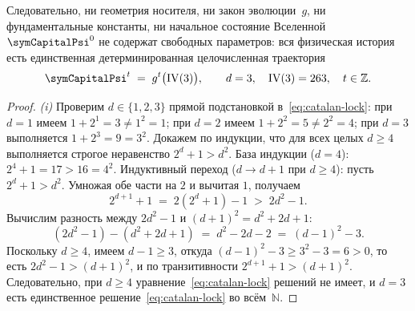 \begin{theorem}[Диофантова единственность $d=3$ ($1+2^d=d^2$), единственность начального вектора $\mathrm{IV}(3)=263$ и полная замкнутость траектории $\symCapitalPsi^t = g^t(\mathrm{IV}(3))$]
Следовательно, ни геометрия носителя, ни закон эволюции~$g$, ни фундаментальные константы, ни начальное состояние Вселенной~$\symCapitalPsi^{0}$
не содержат свободных параметров: вся физическая история есть единственная детерминированная целочисленная траектория
\begin{equation}
\label{eq:closed-universe-trajectory}
  \symCapitalPsi^{t} \;=\; g^{t}\bigl(\mathrm{IV}(3)\bigr),
  \qquad
  d = 3,\quad \mathrm{IV}(3) = 263,\quad t\in\mathbb{Z}.
\end{equation}
\end{theorem}

\begin{proof}
\emph{(i)} Проверим $d\in\{1,2,3\}$ прямой подстановкой в~\eqref{eq:catalan-lock}:
при $d=1$ имеем $1+2^1 = 3 \ne 1^2 = 1$; при $d=2$ имеем $1+2^2 = 5 \ne 2^2 = 4$; при $d=3$ выполняется $1+2^3 = 9 = 3^2$.
Докажем по индукции, что для всех целых $d\ge 4$ выполняется строгое неравенство $2^d + 1 > d^2$.
База индукции ($d=4$): $2^4 + 1 = 17 > 16 = 4^2$.
Индуктивный переход ($d\to d+1$ при $d\ge 4$): пусть $2^d + 1 > d^2$. Умножая обе части на $2$ и вычитая $1$, получаем
\[
  2^{d+1} + 1 \;=\; 2(2^d + 1) - 1 \;>\; 2d^2 - 1.
\]
Вычислим разность между $2d^2 - 1$ и $(d+1)^2 = d^2 + 2d + 1$:
\[
  (2d^2 - 1) - (d^2 + 2d + 1) \;=\; d^2 - 2d - 2 \;=\; (d-1)^2 - 3.
\]
Поскольку $d\ge 4$, имеем $d-1 \ge 3$, откуда $(d-1)^2 - 3 \ge 3^2 - 3 = 6 > 0$, то есть $2d^2 - 1 > (d+1)^2$,
и по транзитивности $2^{d+1} + 1 > (d+1)^2$. Следовательно, при $d\ge 4$ уравнение~\eqref{eq:catalan-lock} решений не имеет,
и $d=3$ есть единственное решение~\eqref{eq:catalan-lock} во всём~$\mathbb{N}$.


\end{proof}
